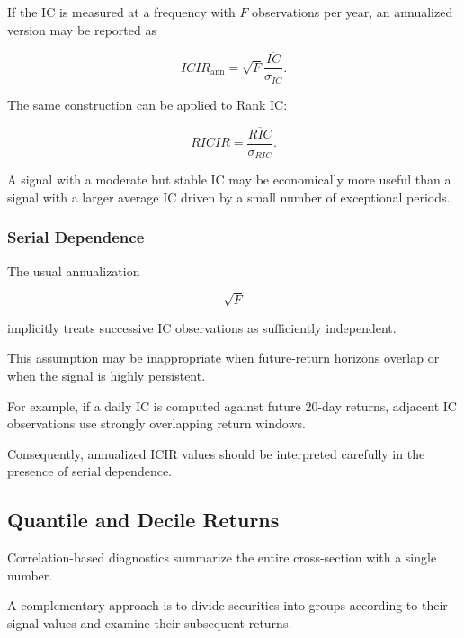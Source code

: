 \documentclass[11pt,a4paper]{article}
\begin{document}
If the IC is measured at a frequency with $F$ observations per year, an
annualized version may be reported as

\begin{equation}
\boxed{
ICIR_{\mathrm{ann}}
=
\sqrt{F}
\frac{
\overline{IC}
}{
\sigma_{IC}
}.
}
\end{equation}

The same construction can be applied to Rank IC:

\begin{equation}
\boxed{
RICIR
=
\frac{
\overline{RIC}
}{
\sigma_{RIC}
}.
}
\end{equation}

A signal with a moderate but stable IC may be economically more useful than a
signal with a larger average IC driven by a small number of exceptional
periods.


\subsubsection{Serial Dependence}

The usual annualization

\begin{equation}
\sqrt{F}
\end{equation}

implicitly treats successive IC observations as sufficiently independent.

This assumption may be inappropriate when future-return horizons overlap or
when the signal is highly persistent.

For example, if a daily IC is computed against future 20-day returns, adjacent
IC observations use strongly overlapping return windows.

Consequently, annualized ICIR values should be interpreted carefully in the
presence of serial dependence.


\subsection{Quantile and Decile Returns}
\label{subsec:quantile_decile_returns}

Correlation-based diagnostics summarize the entire cross-section with a single
number.

A complementary approach is to divide securities into groups according to
their signal values and examine their subsequent returns.
\end{document}
